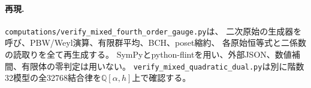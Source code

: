 \paragraph{再現.}
\texttt{computations/verify\_mixed\_fourth\_order\_gauge.py}は、
二次原始の生成器を呼び、PBW/Weyl演算、有限群平均、BCH、poset縮約、
各原始恒等式と二係数の読取りを全て再生成する。
SymPyとpython-flintを用い、外部JSON、数値補間、有限体の零判定は用いない。
\texttt{verify\_mixed\_quadratic\_dual.py}は別に階数32模型の全32768結合律を$\mathbb Q[\alpha,h]$上で確認する。

